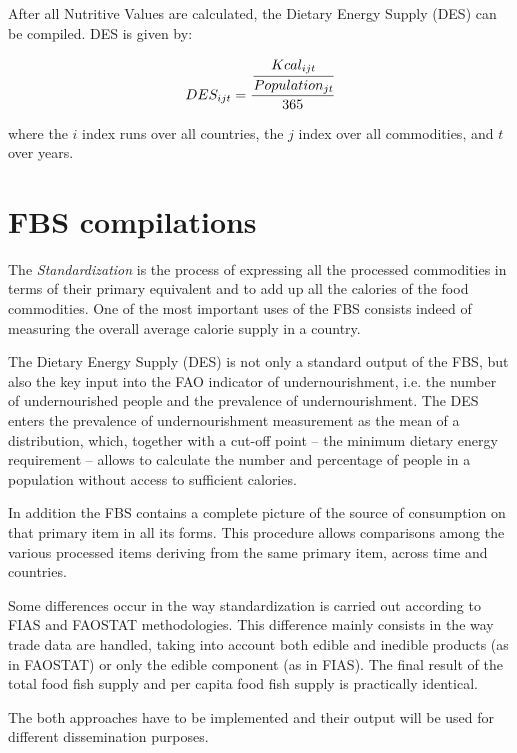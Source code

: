 \documentclass[nojss]{jss}
\begin{document}
After all Nutritive Values are calculated, the Dietary Energy Supply (DES) can be compiled. DES is given by:

\begin{equation}
\label{eq:des}
 DES_{ijt} = \cfrac{\cfrac{Kcal_{ijt}}{Population_{jt}}}{365}
\end{equation}

where the \(i\) index runs over all countries, the \(j\) index over all
commodities, and \(t\) over years.



\section{FBS compilations}

The \textit{Standardization} is the process of expressing all the
processed commodities in terms of their primary equivalent and to add up all the calories of the
food commodities. One of the most important uses of the FBS consists indeed of measuring the overall average calorie supply in a country. 

The Dietary Energy Supply (DES) is not only a standard output of the FBS, but also the key input into the FAO indicator of undernourishment, i.e. the number of undernourished people and the prevalence of undernourishment. The DES enters the prevalence of undernourishment measurement as the mean of a distribution, which, together with a cut-off point – the minimum dietary energy requirement – allows to calculate the number and percentage of people in a population without access to sufficient calories.

In addition the FBS contains a complete picture of the source of consumption on that primary item in all its forms. This procedure allows comparisons among the various processed items deriving from the same primary item, across time and countries.


Some differences occur in the way standardization is carried out according to FIAS and FAOSTAT methodologies. This difference mainly consists in the way trade data are handled, taking into account both edible and inedible products (as in FAOSTAT) or only the edible component (as in FIAS). The final result of the total food fish supply and per capita food fish supply is practically identical.  

The both approaches have to be implemented and their output will be used for different dissemination purposes.
\end{document}
